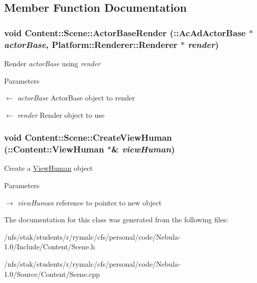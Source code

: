 \subsection{Member Function Documentation}
\hypertarget{classContent_1_1Scene_aa23a026de11723b0e67eeb7bf46a08c7}{
\subsubsection[{ActorBaseRender}]{\setlength{\rightskip}{0pt plus 5cm}void Content::Scene::ActorBaseRender (::{\bf AcAdActorBase} $\ast$ {\em actorBase}, \/  {\bf Platform::Renderer::Renderer} $\ast$ {\em render})}}
\label{classContent_1_1Scene_aa23a026de11723b0e67eeb7bf46a08c7}
Render {\itshape actorBase\/} using {\itshape render\/} 
\begin{DoxyParams}{Parameters}
\item[\mbox{$\leftarrow$} {\em actorBase}]ActorBase object to render \item[\mbox{$\leftarrow$} {\em render}]Render object to use \end{DoxyParams}
\hypertarget{classContent_1_1Scene_abfc7b71be87293aba330902c9c9fbc41}{
\subsubsection[{CreateViewHuman}]{\setlength{\rightskip}{0pt plus 5cm}void Content::Scene::CreateViewHuman (::{\bf Content::ViewHuman} $\ast$\& {\em viewHuman})}}
\label{classContent_1_1Scene_abfc7b71be87293aba330902c9c9fbc41}
Create a \hyperlink{classContent_1_1ViewHuman}{ViewHuman} object 
\begin{DoxyParams}{Parameters}
\item[\mbox{$\rightarrow$} {\em viewHuman}]reference to pointer to new object \end{DoxyParams}


The documentation for this class was generated from the following files:\begin{DoxyCompactItemize}
\item 
/nfs/stak/students/r/rymalc/cfs/personal/code/Nebula-\/1.0/Include/Content/Scene.h\item 
/nfs/stak/students/r/rymalc/cfs/personal/code/Nebula-\/1.0/Source/Content/Scene.cpp\end{DoxyCompactItemize}
